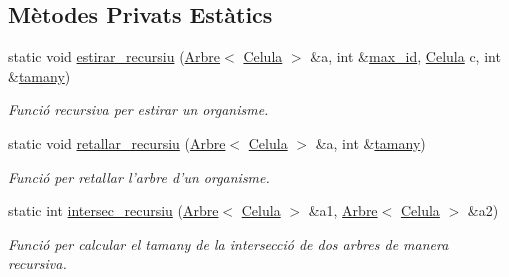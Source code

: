\subsection*{Mètodes Privats Estàtics}
\begin{DoxyCompactItemize}
\item 
static void \hyperlink{class_organisme_a8dbc9127169717373507ddac7a9c7df9}{estirar\-\_\-recursiu} (\hyperlink{class_arbre}{Arbre}$<$ \hyperlink{struct_celula}{Celula} $>$ \&a, int \&\hyperlink{class_organisme_ae7f51a74f01cee155cf88a5b01545f78}{max\-\_\-id}, \hyperlink{struct_celula}{Celula} c, int \&\hyperlink{class_organisme_a5d30992b5ded1a9314aff94ce9fb3932}{tamany})
\begin{DoxyCompactList}\small\item\em Funció recursiva per estirar un organisme. \end{DoxyCompactList}\item 
static void \hyperlink{class_organisme_ae6b5820dd264a10c31c052e1870c4e8a}{retallar\-\_\-recursiu} (\hyperlink{class_arbre}{Arbre}$<$ \hyperlink{struct_celula}{Celula} $>$ \&a, int \&\hyperlink{class_organisme_a5d30992b5ded1a9314aff94ce9fb3932}{tamany})
\begin{DoxyCompactList}\small\item\em Funció per retallar l'arbre d'un organisme. \end{DoxyCompactList}\item 
static int \hyperlink{class_organisme_add0b533b80fa284326cef38f1de3420b}{intersec\-\_\-recursiu} (\hyperlink{class_arbre}{Arbre}$<$ \hyperlink{struct_celula}{Celula} $>$ \&a1, \hyperlink{class_arbre}{Arbre}$<$ \hyperlink{struct_celula}{Celula} $>$ \&a2)
\begin{DoxyCompactList}\small\item\em Funció per calcular el tamany de la intersecció de dos arbres de manera recursiva. \end{DoxyCompactList}\end{DoxyCompactItemize}
